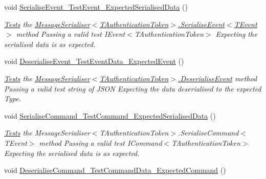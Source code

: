 \begin{DoxyCompactItemize}
\item 
void \hyperlink{classCqrs_1_1Azure_1_1ServiceBus_1_1Tests_1_1Unit_1_1MessageSerialiserTests_a9915b4ada786289ec41f1444374a3884_a9915b4ada786289ec41f1444374a3884}{Serialise\+Event\+\_\+\+Test\+Event\+\_\+\+Expected\+Serialised\+Data} ()
\begin{DoxyCompactList}\small\item\em \hyperlink{namespaceCqrs_1_1Azure_1_1ServiceBus_1_1Tests}{Tests} the \hyperlink{classCqrs_1_1Azure_1_1ServiceBus_1_1MessageSerialiser_a596224ec927c673958e72a2153931c09_a596224ec927c673958e72a2153931c09}{Message\+Serialiser$<$\+T\+Authentication\+Token$>$.\+Serialise\+Event$<$\+T\+Event$>$} method Passing a valid test I\+Event$<$\+T\+Authentication\+Token$>$ Expecting the serialised data is as expected. \end{DoxyCompactList}\item 
void \hyperlink{classCqrs_1_1Azure_1_1ServiceBus_1_1Tests_1_1Unit_1_1MessageSerialiserTests_ad7bc69e1f1d8741b8520f76cc5e034c2_ad7bc69e1f1d8741b8520f76cc5e034c2}{Deserialise\+Event\+\_\+\+Test\+Event\+Data\+\_\+\+Expected\+Event} ()
\begin{DoxyCompactList}\small\item\em \hyperlink{namespaceCqrs_1_1Azure_1_1ServiceBus_1_1Tests}{Tests} the \hyperlink{classCqrs_1_1Azure_1_1ServiceBus_1_1MessageSerialiser_a7b96e89475e9218fcb7a690fe4d02279_a7b96e89475e9218fcb7a690fe4d02279}{Message\+Serialiser$<$\+T\+Authentication\+Token$>$.\+Deserialise\+Event} method Passing a valid test string of J\+S\+ON Expecting the data deserialised to the expected Type. \end{DoxyCompactList}\item 
void \hyperlink{classCqrs_1_1Azure_1_1ServiceBus_1_1Tests_1_1Unit_1_1MessageSerialiserTests_a9a2a5ddf1c109f58bb27c651fb9ec42a_a9a2a5ddf1c109f58bb27c651fb9ec42a}{Serialise\+Command\+\_\+\+Test\+Command\+\_\+\+Expected\+Serialised\+Data} ()
\begin{DoxyCompactList}\small\item\em \hyperlink{namespaceCqrs_1_1Azure_1_1ServiceBus_1_1Tests}{Tests} the Message\+Serialiser$<$\+T\+Authentication\+Token$>$.\+Serialise\+Command$<$\+T\+Event$>$ method Passing a valid test I\+Command$<$\+T\+Authentication\+Token$>$ Expecting the serialised data is as expected. \end{DoxyCompactList}\item 
void \hyperlink{classCqrs_1_1Azure_1_1ServiceBus_1_1Tests_1_1Unit_1_1MessageSerialiserTests_a33c0538a90a7ed653350ccc7d3c38f49_a33c0538a90a7ed653350ccc7d3c38f49}{Deserialise\+Command\+\_\+\+Test\+Command\+Data\+\_\+\+Expected\+Command} ()

\end{DoxyCompactItemize}
